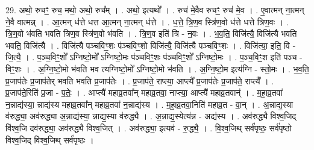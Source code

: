 \documentclass[17pt]{extarticle}
\begin{document}
29. अथो॒ रुचꣳ॒॒ रुच॒ मथो॒ अथो॒ रुच᳚म् । . अथो॒ इत्यथो᳚ । . रुच॑ मे॒वैव रुचꣳ॒॒ रुच॑ मे॒व । . ए॒वात्मन् ना॒त्मन् ने॒वै वात्मन्न् । . आ॒त्मन् ध॑त्ते धत्त आ॒त्मन् ना॒त्मन् ध॑त्ते । . ध॒त्ते॒ त्रि॒ण॒व स्त्रि॑ण॒वो ध॑त्ते धत्ते त्रिण॒वः । . त्रि॒ण॒वो भ॑वति भवति त्रिण॒व स्त्रि॑ण॒वो भ॑वति । . त्रि॒ण॒व इति॑ त्रि - न॒वः । . भ॒व॒ति॒ विजि॑त्यै॒ विजि॑त्यै भवति भवति॒ विजि॑त्यै । . विजि॑त्यै पञ्चविꣳ॒॒शः प॑ञ्चविꣳ॒॒शो विजि॑त्यै॒ विजि॑त्यै पञ्चविꣳ॒॒शः । . विजि॑त्या॒ इति॒ वि - जि॒त्यै॒ । . प॒ञ्च॒विꣳ॒॒शो᳚ ऽग्निष्टो॒मो᳚ ऽग्निष्टो॒मः प॑ञ्चविꣳ॒॒शः प॑ञ्चविꣳ॒॒शो᳚ ऽग्निष्टो॒मः । . प॒ञ्च॒विꣳ॒॒श इति॑ पञ्च - विꣳ॒॒शः । . अ॒ग्नि॒ष्टो॒मो भ॑वति भव त्यग्निष्टो॒मो᳚ ऽग्निष्टो॒मो भ॑वति । . अ॒ग्नि॒ष्टो॒म इत्य॑ग्नि - स्तो॒मः । . भ॒व॒ति॒ प्र॒जाप॑तेः प्र॒जाप॑तेर् भवति भवति प्र॒जाप॑तेः । . प्र॒जाप॑ते॒ राप्त्या॒ आप्त्यै᳚ प्र॒जाप॑तेः प्र॒जाप॑ते॒ राप्त्यै᳚ । . प्र॒जाप॑ते॒रिति॑ प्र॒जा - प॒तेः॒ । . आप्त्यै॑ महाव्र॒तवा᳚न् महाव्र॒तवा॒ नाप्त्या॒ आप्त्यै॑ महाव्र॒तवान्॑ । . म॒हा॒व्र॒तवा॑ न॒न्नाद्य॑स्या॒ न्नाद्य॑स्य महाव्र॒तवा᳚न् महाव्र॒तवा॑ न॒न्नाद्य॑स्य । . म॒हा॒व्र॒तवा॒निति॑ महाव्र॒त - वा॒न् । . अ॒न्नाद्य॒स्या व॑रुद्ध्या॒ अव॑रुद्ध्या अ॒न्नाद्य॑स्या॒ न्नाद्य॒स्या व॑रुद्ध्यै । . अ॒न्नाद्य॒स्येत्य॑न्न - अद्य॑स्य । . अव॑रुद्ध्यै विश्व॒जिद् वि॑श्व॒जि दव॑रुद्ध्या॒ अव॑रुद्ध्यै विश्व॒जित् । . अव॑रुद्ध्या॒ इत्यव॑ - रु॒द्ध्यै॒ । . वि॒श्व॒जिथ् सर्व॑पृष्ठः॒ सर्व॑पृष्ठो विश्व॒जिद् वि॑श्व॒जिथ् सर्व॑पृष्ठः । \newline
\end{document}
